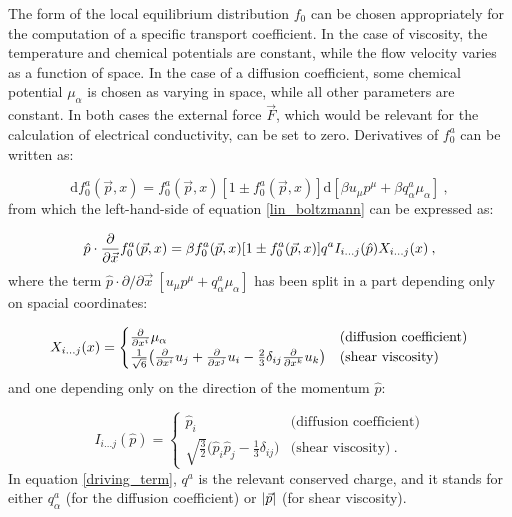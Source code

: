 The form of the local equilibrium distribution $f_0$ can be chosen appropriately for the computation of a specific transport coefficient. In the case of viscosity, the temperature and chemical potentials are constant, while the flow velocity varies as a function of space. In the case of a diffusion coefficient, some chemical potential $\mu_{\alpha}$ is chosen as varying in space, while all other parameters are constant. In both cases the external force $\vec F$, which would be relevant for the calculation of electrical conductivity, can be set to zero. Derivatives of $f_0^a$ can be written as:

\begin{equation}
\mathrm d f_0^a(\vec p,x) = f_0^a(\vec p,x) [1 \pm f_0^a(\vec p,x)] \mathrm d [\beta u_{\mu}p^{\mu} + \beta q^a_{\alpha} \mu_{\alpha}] \: ,
\end{equation}
%
from which the left-hand-side of equation \ref{lin_boltzmann} can be expressed as:

\begin{equation}
 \hat p \cdot \frac{\partial  }{\partial \vec x} f^a_0(\vec p, x) = \beta f_0^a(\vec p,x) [1 \pm f_0^a(\vec p,x)] q^a I_{i \dots j} (\hat p) X_{i \dots j} (x) \: ,
\label{driving_term}
\end{equation}
%
where the term $ \hat p \cdot \partial /\partial \vec x \: [u_{\mu}p^{\mu} + q^a_{\alpha} \mu_{\alpha}]$ has been split in a part depending only on spacial coordinates:

\begin{equation}
X_{i \dots j} (x) =
\begin{cases}
\frac{\partial  }{\partial x^i} \mu_{\alpha} & \mbox{(diffusion coefficient)} \\
\frac{1}{\sqrt 6} \bigl( \frac{\partial  }{\partial x^i} u_j + \frac{\partial  }{\partial x^j} u_i -\frac{2}{3} \delta_{ij} \frac{\partial  }{\partial x^k} u_k \bigr) & \mbox{(shear viscosity)}
\end{cases}
\end{equation}
%
and one depending only on the direction of the momentum $\hat p$:

\begin{equation}
I_{i \dots j} (\hat p)=
\begin{cases}
\hat p_i & \mbox{(diffusion coefficient)} \\
\sqrt{\frac{3}{2}} \bigl(\hat p_i \hat p_j - \frac{1}{3}\delta_{ij} \bigr) & \mbox{(shear viscosity)} \: .
\end{cases}
\end{equation}
%
In equation \ref{driving_term}, $q^a$ is the relevant conserved charge, and it stands for either $q^a_{\alpha}$ (for the diffusion coefficient) or $\abs{\vec p}$ (for shear viscosity).

